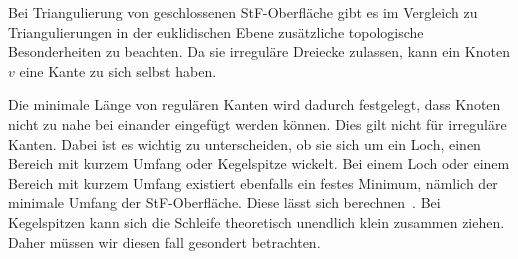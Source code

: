 



Bei Triangulierung von geschlossenen StF-Oberfläche gibt es im Vergleich zu Triangulierungen in der euklidischen Ebene zusätzliche topologische Besonderheiten zu beachten. Da sie irreguläre Dreiecke zulassen, kann ein Knoten $v$ eine Kante \irregulaereKante zu sich selbst haben.    



Die minimale Länge von regulären Kanten wird dadurch festgelegt, dass Knoten nicht zu nahe bei einander eingefügt werden können. Dies gilt nicht für irreguläre Kanten.
Dabei ist es wichtig zu unterscheiden, ob sie sich um ein Loch, einen Bereich mit kurzem Umfang oder Kegelspitze wickelt. Bei einem Loch oder einem Bereich mit kurzem Umfang existiert ebenfalls ein festes Minimum, nämlich der minimale Umfang der StF-Oberfläche. Diese lässt sich berechnen~\cite{erickson:2005:generator}. Bei Kegelspitzen kann sich die Schleife  theoretisch unendlich klein zusammen ziehen. Daher müssen wir diesen fall gesondert betrachten.   





